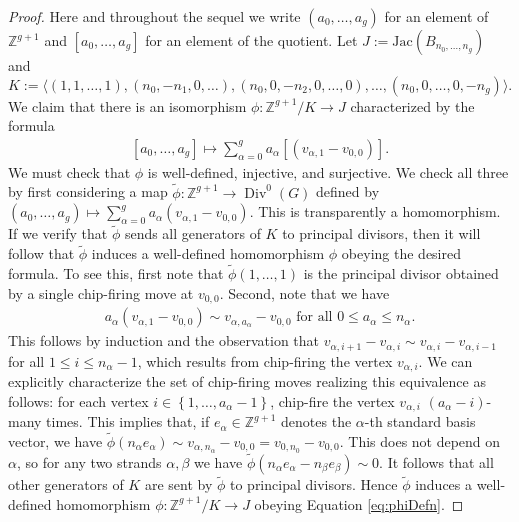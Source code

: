 \documentclass[11pt]{article}
\theoremstyle{definition}
\numberwithin{equation}{section}
\newcommand{\Z}{\mathbb{Z}}
\newcommand{\jac}[1]{\mathrm{Jac}\left({#1}\right)}
\newcommand{\set}[1]{\left\{{#1}\right\}}
\newcommand{\gen}[1]{\langle #1 \rangle}
\begin{document}
\begin{proof}
\newcommand{\tphi}{\widetilde{\phi}}
    Here and throughout the sequel we write $(a_0,\dots,a_g)$ for an element of $\Z^{g+1}$ and $[a_0,\dots,a_g]$ for an element of the quotient. Let $J:= \jac{B_{n_0,\dots,n_g}}$ and $$K:=\gen{(1,1,\dots,1),(n_0,-n_1,0,\dots),(n_0,0,-n_2,0,\dots,0),\dots,(n_0,0,\dots,0,-n_g)}.$$ 
    We claim that there is an isomorphism $\phi:\Z^{g+1}/K \to J$ characterized by the formula 
     \begin{align} \label{eq:phiDefn}
        [a_0,\dots,a_g]\mapsto \sum_{\alpha = 0}^g a_\alpha [(v_{\alpha,1}-v_{0,0})].
    \end{align}
    We must check that $\phi$ is well-defined, injective, and surjective. We check all three by first considering a map 
    $\tphi: \Z^{g+1} \to \operatorname{Div}^0(G)$ defined by $(a_0, \ldots, a_g) \mapsto \sum_{\alpha=0}^g a_\alpha (v_{\alpha,1} - v_{0,0})$. This is transparently a homomorphism. If we verify that $\tphi$ sends all generators of $K$ to principal divisors, then it will follow that $\tphi$ induces a well-defined homomorphism $\phi$ obeying the desired formula. To see this, first note that $\tphi(1,\ldots,1)$ is the principal divisor obtained by a single chip-firing move at $v_{0,0}$. Second, note that we have
    \begin{align}\label{eq:multDiff}
    a_\alpha (v_{\alpha,1} - v_{0,0}) \sim v_{\alpha, a_\alpha} - v_{0,0} \mbox{ for all } 0 \leq a_\alpha \leq n_\alpha.
    \end{align}
    This follows by induction and the observation that $v_{\alpha,i+1} - v_{\alpha,i} \sim v_{\alpha,i} - v_{\alpha, i-1}$ for all $1 \leq i \leq n_\alpha-1$, which results from chip-firing the vertex $v_{\alpha,i}$. We can explicitly characterize the set of chip-firing moves realizing this equivalence as follows: for each vertex $i \in \set{1,\dots,a_\alpha-1}$, chip-fire the vertex $v_{\alpha,i}$ $(a_\alpha-i)$-many  times. This implies that, if $e_\alpha \in \Z^{g+1}$ denotes the $\alpha$-th standard basis vector, we have $\tphi(n_\alpha e_\alpha) \sim v_{\alpha, n_\alpha} - v_{0,0} = v_{0,n_0} - v_{0,0}$. This does not depend on $\alpha$, so for any two strands $\alpha, \beta$ we have $\tphi(n_\alpha e_\alpha - n_\beta e_\beta) \sim 0$. It follows that all other generators of $K$ are sent by $\tphi$ to principal divisors. Hence $\tphi$ induces a well-defined homomorphism $\phi: \Z^{g+1} / K \to J$ obeying Equation \eqref{eq:phiDefn}.
    

\end{proof}
\end{document}
